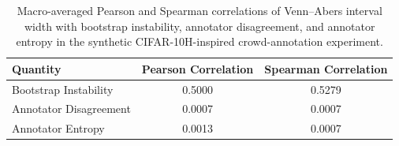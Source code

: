 \begin{table}[htbp]
\centering
\caption{Macro-averaged Pearson and Spearman correlations of Venn--Abers interval width with bootstrap instability, annotator disagreement, and annotator entropy in the synthetic CIFAR-10H-inspired crowd-annotation experiment.}
\label{tab:cifar_correlations}
\begin{tabular}{lcc}
\toprule
Quantity & Pearson Correlation & Spearman Correlation \\
\midrule
Bootstrap Instability & 0.5000 & 0.5279 \\
Annotator Disagreement & 0.0007 & 0.0007 \\
Annotator Entropy & 0.0013 & 0.0007 \\
\bottomrule
\end{tabular}
\end{table}
